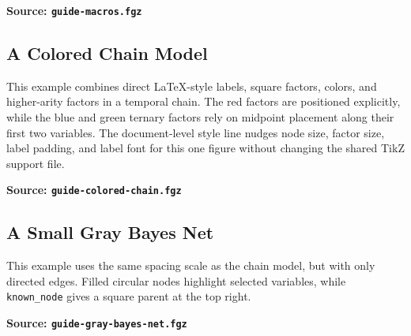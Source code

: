 \documentclass{article}
\begin{document}
\begin{samepage}
  \noindent
  \begin{minipage}[t]{0.41\textwidth}
    \centering
    \vspace{0.5cm}
    
  \end{minipage}\hfill
  \begin{minipage}[t]{0.55\textwidth}
    \textbf{Source: \texttt{guide-macros.fgz}}
  \end{minipage}
\end{samepage}


\newpage
\subsection{A Colored Chain Model}
This example combines direct LaTeX-style labels, square factors, colors, and higher-arity
factors in a temporal chain. The red factors are positioned explicitly, while the blue and
green ternary factors rely on midpoint placement along their first two variables. The
document-level style line nudges node size, factor size, label padding, and label font for
this one figure without changing the shared TikZ support file.

\vspace{0.5cm}
\begin{samepage}
  \centering
  \scalebox{0.82}{}

  \medskip
  \noindent\textbf{Source: \texttt{guide-colored-chain.fgz}}
\end{samepage}

\subsection{A Small Gray Bayes Net}
This example uses the same spacing scale as the chain model, but with only directed edges.
Filled circular nodes highlight selected variables, while \texttt{known\_node} gives a square
parent at the top right.

\begin{samepage}
  \noindent
  \begin{minipage}[t]{0.41\textwidth}
    \centering
    \vspace{0.4cm}
    
  \end{minipage}\hfill
  \begin{minipage}[t]{0.55\textwidth}
    \textbf{Source: \texttt{guide-gray-bayes-net.fgz}}
  \end{minipage}
\end{samepage}
\end{document}
